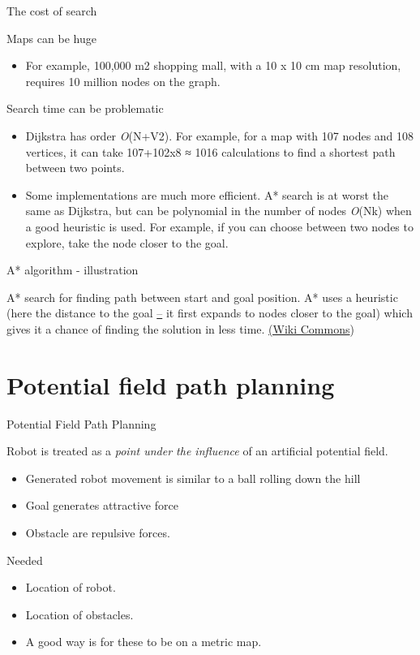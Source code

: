 \documentclass[compress]{beamer}
\begin{document}
\begin{frame}{The cost of search}

Maps can be huge

\begin{itemize}
\item For example, 100,000 m2 shopping mall, with a 10 x 10 cm map
  resolution, requires 10 million nodes on the graph.
\end{itemize}

Search time can be problematic

\begin{itemize}
\item Dijkstra has order \emph{O}(N+V2). For example, for a map with 107
  nodes and 108 vertices, it can take 107+102x8 ≈ 1016 calculations to
  find a shortest path between two points.
\item Some implementations are much more efficient. A* search is at worst
  the same as Dijkstra, but can be polynomial in the number of nodes
  \emph{O}(Nk) when a good heuristic is used. For example, if you can
  choose between two nodes to explore, take the node closer to the goal.
\end{itemize}

\end{frame}

\begin{frame}{A* algorithm - illustration}

A* search for finding path between start and goal position. A* uses a
heuristic (here the distance to the goal
\href{http://en.wikipedia.org/wiki/A*_search_algorithm}{--} it first
expands to nodes closer to the goal) which gives it a chance of finding
the solution in less time.
\href{http://en.wikipedia.org/wiki/A*_search_algorithm}{(Wiki Commons})

\end{frame}

\section{Potential field path planning}

\begin{frame}{Potential Field Path Planning}

Robot is treated as a \emph{point under the influence} of an artificial
potential field.

\begin{itemize}
\item Generated robot movement is similar to a ball rolling down the hill
\item Goal generates attractive force
\item Obstacle are repulsive forces.
\end{itemize}

Needed

\begin{itemize}
\item Location of robot.
\item Location of obstacles.
\item A good way is for these to be on a metric map.
\end{itemize}

\end{frame}
\end{document}
